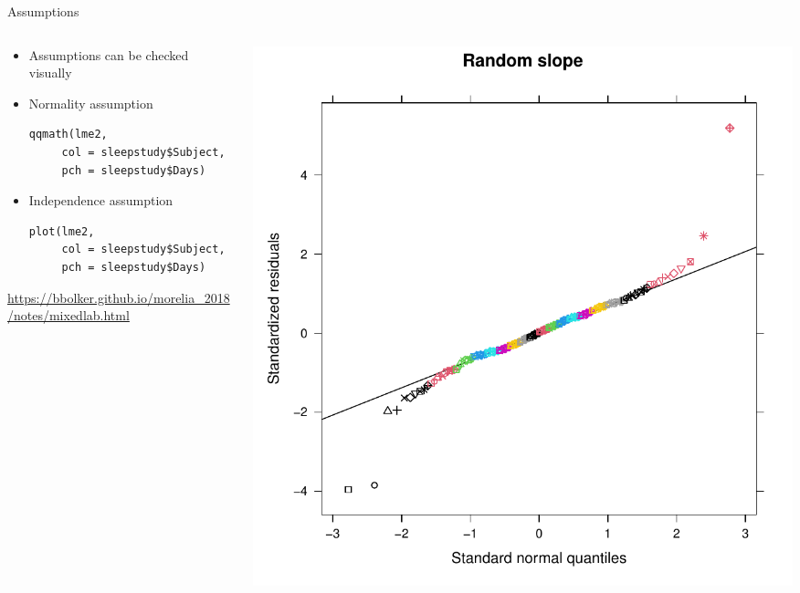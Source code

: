 \documentclass[aspectratio=169]{beamer}
\begin{document}
\begin{frame}[fragile]{Assumptions}
  \begin{columns}
    \begin{column}{.5\textwidth}
      \begin{itemize}
        \item Assumptions can be checked visually
        \item Normality assumption
          \begin{lstlisting}
qqmath(lme2,
     col = sleepstudy$Subject,
     pch = sleepstudy$Days)
          \end{lstlisting}
        \item Independence assumption
          \begin{lstlisting}
plot(lme2,
     col = sleepstudy$Subject,
     pch = sleepstudy$Days)
          \end{lstlisting}
      \end{itemize}
      {\tiny \url{https://bbolker.github.io/morelia_2018/notes/mixedlab.html}}
    \end{column}
    \begin{column}{.5\textwidth}
      \includegraphics[scale=.5]{../figures/assump_qqplot_slope.pdf}
    \end{column}
  \end{columns}
\end{frame}
\end{document}
